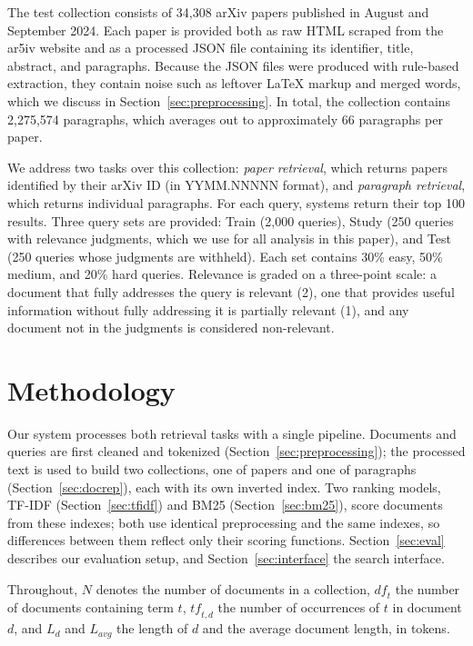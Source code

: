 \documentclass[sigconf,nonacm]{acmart}
\begin{document}
The test collection consists of 34,308 arXiv papers published in August
and September 2024. Each paper is provided both as raw HTML scraped from
the ar5iv website and as a processed JSON file containing its identifier,
title, abstract, and paragraphs. Because the JSON files were produced with
rule-based extraction, they contain noise such as leftover \LaTeX{} markup
and merged words, which we discuss in Section~\ref{sec:preprocessing}.
In total, the collection contains 2,275,574 paragraphs, which averages out
to approximately 66 paragraphs per paper.

We address two tasks over this collection: \emph{paper retrieval}, which
returns papers identified by their arXiv ID (in YYMM.NNNNN format), and
\emph{paragraph retrieval}, which returns individual paragraphs. For each
query, systems return their top 100 results. Three query sets are
provided: Train (2,000 queries), Study (250 queries with relevance
judgments, which we use for all analysis in this paper), and Test (250
queries whose judgments are withheld). Each set contains 30\% easy, 50\%
medium, and 20\% hard queries. Relevance is graded on a three-point
scale: a document that fully addresses the query is relevant (2), one that
provides useful information without fully addressing it is partially
relevant (1), and any document not in the judgments is considered
non-relevant.

\section{Methodology}
\label{sec:method}

Our system processes both retrieval tasks with a single pipeline.
Documents and queries are first cleaned and tokenized
(Section~\ref{sec:preprocessing}); the processed text is used to build
two collections, one of papers and one of paragraphs
(Section~\ref{sec:docrep}), each with its own inverted index. Two ranking
models, TF-IDF (Section~\ref{sec:tfidf}) and BM25
(Section~\ref{sec:bm25}), score documents from these indexes; both use
identical preprocessing and the same indexes, so differences between them
reflect only their scoring functions. Section~\ref{sec:eval} describes our
evaluation setup, and Section~\ref{sec:interface} the search interface.

Throughout, $N$ denotes the number of documents in a collection,
$\mathit{df}_t$ the number of documents containing term $t$,
$\mathit{tf}_{t,d}$ the number of occurrences of $t$ in document $d$,
and $L_d$ and $L_{\mathit{avg}}$ the length of $d$ and the average
document length, in tokens.
\end{document}

